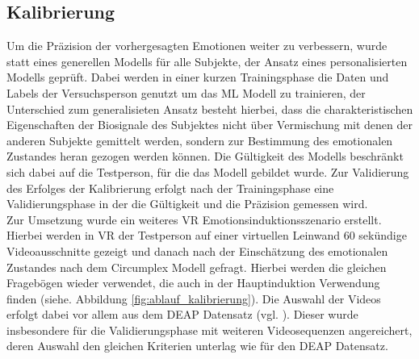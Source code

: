 \subsection{Kalibrierung} \label{kalibrierung-4}


Um die Präzision der vorhergesagten Emotionen weiter zu verbessern, wurde statt eines generellen Modells für alle Subjekte, der Ansatz eines personalisierten Modells geprüft. Dabei werden in einer kurzen Trainingsphase die Daten und Labels der Versuchsperson genutzt um das ML Modell zu trainieren, der Unterschied zum generalisieten Ansatz besteht hierbei, dass die charakteristischen Eigenschaften der Biosignale des Subjektes nicht über Vermischung mit denen der anderen Subjekte gemittelt werden, sondern zur Bestimmung des emotionalen Zustandes heran gezogen werden können. Die Gültigkeit des Modells beschränkt sich dabei auf die Testperson, für die das Modell gebildet wurde. Zur Validierung des Erfolges der Kalibrierung erfolgt nach der Trainingsphase eine Validierungsphase in der die Gültigkeit und die Präzision gemessen wird. \\

Zur Umsetzung wurde ein weiteres VR Emotionsinduktionsszenario erstellt. Hierbei werden in VR der Testperson auf einer virtuellen Leinwand 60 sekündige Videoausschnitte gezeigt und danach nach der Einschätzung des emotionalen Zustandes nach dem Circumplex Modell gefragt. Hierbei werden die gleichen Fragebögen wieder verwendet, die auch in der Hauptinduktion Verwendung finden (siehe. Abbildung \ref{fig:ablauf_kalibrierung}). Die Auswahl der Videos erfolgt dabei vor allem aus dem DEAP Datensatz (vgl. \cite{}). Dieser wurde insbesondere für die Validierungsphase mit weiteren Videosequenzen angereichert, deren Auswahl den gleichen Kriterien unterlag wie für den DEAP Datensatz. \\

